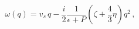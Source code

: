 \begin{equation}\label{hydro_sound}
  \omega(q) = v_s \, q - \frac i2 \frac1{\epsilon+P}\left(
  \zeta + \frac43\eta\right) q^2\,,
\end{equation}

